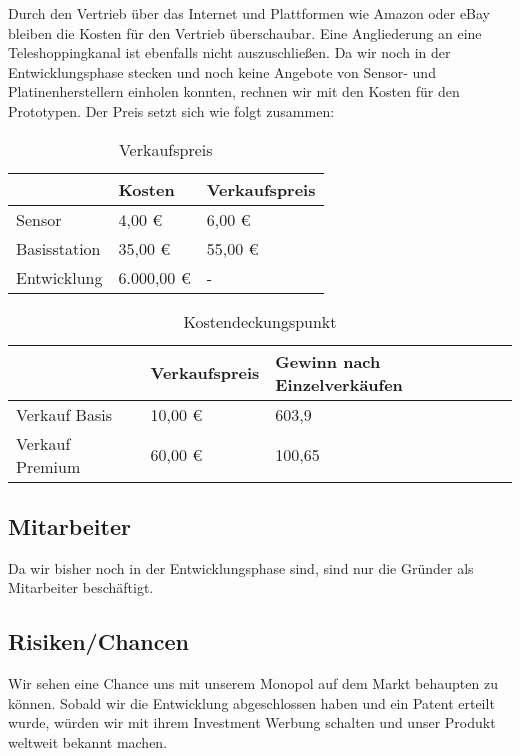			Durch den Vertrieb über das Internet und Plattformen wie Amazon oder eBay bleiben die Kosten für den Vertrieb überschaubar. Eine Angliederung an eine Teleshoppingkanal ist ebenfalls nicht auszuschließen. Da wir noch in der Entwicklungsphase stecken und noch keine Angebote von Sensor- und Platinenherstellern einholen konnten, rechnen wir mit den Kosten für den Prototypen. Der Preis setzt sich wie folgt zusammen:
\begin{table}[htbp]
  \centering
  \caption{Verkaufspreis}
    \begin{tabularx}{\textwidth}{|X|XX|}
    \toprule
    & Kosten & Verkaufspreis\\
    \midrule
    Sensor & 4,00 € & 6,00 € \\
    Basisstation & 35,00 € & 55,00 € \\
    Entwicklung & 6.000,00 € & - \\
    \bottomrule
    \end{tabularx}%
  \label{tab:addlabel}%
\end{table}%

\begin{table}[htbp]
	\centering
	\caption{Kostendeckungspunkt}
	\begin{tabularx}{\textwidth}{|X|XX|}
		\toprule
		& Verkaufspreis & Gewinn nach Einzelverkäufen \\
		\midrule
		Verkauf Basis & 10,00 € & 603,9 \\
		 Verkauf Premium & 60,00 € & 100,65 \\
		\bottomrule
	\end{tabularx}%
	\label{tab:addlabel}%
\end{table}%

\subsection{Mitarbeiter}
	Da wir bisher noch in der Entwicklungsphase sind, sind nur die Gründer als Mitarbeiter beschäftigt. 
			
\subsection{Risiken/Chancen}
	Wir sehen eine Chance uns mit unserem Monopol auf dem Markt behaupten zu können. 
			Sobald wir die Entwicklung abgeschlossen haben und ein Patent erteilt wurde, würden wir mit ihrem Investment Werbung schalten und unser Produkt weltweit bekannt machen.

